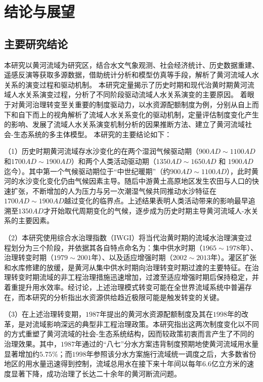 \chapter{结论与展望}

\section{主要研究结论}

本研究以黄河流域为研究区，结合水文气象观测、社会经济统计、历史数据重建、遥感反演等获取多源数据，借助统计分析和模型仿真等手段，解析了黄河流域人水关系的演变过程和驱动机制。
本研究定量揭示了历史时期和现代治黄时期黄河流域人水关系演变过程，分析了不同阶段驱动流域人水关系演变的主要原因。
着眼于对黄河治理转变至关重要的制度驱动力，以水资源配额制度为例，分别从自上而下和自下而上的视角解析了流域人水关系变化的驱动机制，定量评估制度变化产生的影响、发展了流域人水关系演变机制分析的因果推断方法、建立了黄河流域社会-生态系统的多主体模型。
本研究的主要结论如下：

（1）历史时期黄河流域存水沙变化的在两个湿润气候驱动期（$900AD\sim1100AD$和$1700AD\sim1900AD$）和两个人类活动驱动期（$1350AD \sim 1650AD$ 和 $1900AD$迄今）。其中第一个气候驱动期位于“中世纪暖期”（约$900AD \sim 1100AD$），此时黄河的水沙变化变化仍由气候因素主导。随后中游黄土高原地区发生农田与人口的快速扩张，不断增加的人为压力与另一次潮湿气候共同推动水沙特征在$1700AD \sim 1900AD$越过变化的临界点。上述结果表明人类活动带来的影响最早追溯至$1350AD$才开始取代周期变化的气候，逐步成为历史时期主导黄河流域人-水关系的主要因素。

（2）本研究使用综合水治理指数（IWGI）将当代治黄时期的流域水治理演变过程划分为三个阶段，并依据其各自特点命名为：集中供水时期（$1965 \sim 1978$年）、治理转变时期（$1979 \sim 2001$年）、以及适应增强时期（$2002 \sim 2013$年）。灌区扩张和水库修建的放缓，是黄河从集中供水时期向治理转变时期过渡的主要特征。在治理转变时期流域的非工程治理措施迅速增加，过渡至适应增强时期后保持稳定，并着重提升用水效率。经讨论，上述治理模式转变可能在全世界流域系统中普遍存在，而本研究的分析指出水资源供给趋近极限可能是触发转变的关键。

（3）在上述治理转变期，$1987$年提出的黄河水资源配额制度及其在$1998$年的改革，是对流域影响深远的典型非工程治理政策。本研究指出这两次制度变化以不同的方式重塑了黄河流域的社会-生态系统结构，因而较政策初衷而言产生了不同的治理效果。其中，$1987$年通过的“八七”分水方案违背制度预期地使黄河流域用水量显著增加约$5.75\%$；而$1998$年参照该分水方案施行流域统一调度之后，大多数省份地区的用水量迅速得到控制，流域总用水在接下来十年间以每年$6.6$亿立方米的速度显著下降，成功治理了长达二十余年的黄河断流问题。

